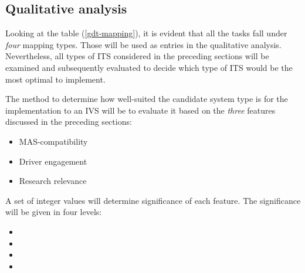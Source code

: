 \documentclass[main.tex]{subfiles}
\begin{document}

\subsection{Qualitative analysis}

Looking at the table (\ref{gdt-mapping}), it is evident that all the tasks fall under \emph{four} 
mapping types. Those will be used as entries in the qualitative analysis. Nevertheless,
all types of ITS considered in the preceding sections will be examined and subsequently
evaluated to decide which type of ITS would be the most optimal to implement. 

The method to determine how well-suited the candidate system type is for the implementation to an IVS 
will be to evaluate it based on the \emph{three} features discussed in the preceding sections: 

\begin{itemize}
    \item MAS-compatibility
    \item Driver engagement
    \item Research relevance
\end{itemize}

A set of integer values will determine significance of each feature. The significance
will be given in four levels:

\begin{itemize}
    \item {}
    \item {}
    \item {}
    \item {}
\end{itemize}
\end{document}
